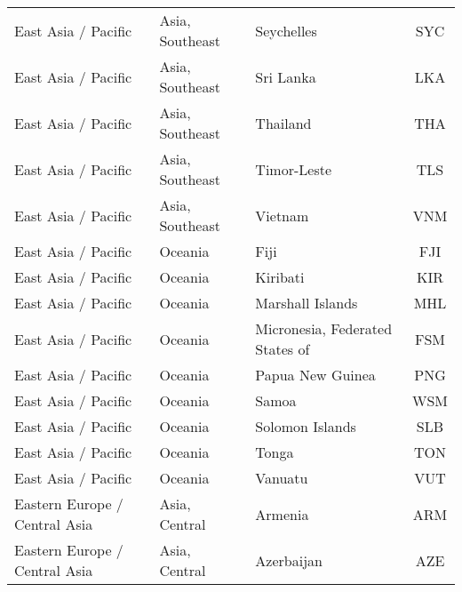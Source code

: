 \begin{longtable}{|p{3cm}|p{3.5cm}|p{5cm}|c|}
           East Asia / Pacific &              Asia, Southeast &                                        Seychelles &  SYC \\
           East Asia / Pacific &              Asia, Southeast &                                         Sri Lanka &  LKA \\
           East Asia / Pacific &              Asia, Southeast &                                          Thailand &  THA \\
           East Asia / Pacific &              Asia, Southeast &                                       Timor-Leste &  TLS \\
           East Asia / Pacific &              Asia, Southeast &                                           Vietnam &  VNM \\
           East Asia / Pacific &                      Oceania &                                              Fiji &  FJI \\
           East Asia / Pacific &                      Oceania &                                          Kiribati &  KIR \\
           East Asia / Pacific &                      Oceania &                                  Marshall Islands &  MHL \\
           East Asia / Pacific &                      Oceania &                   Micronesia, Federated States of &  FSM \\
           East Asia / Pacific &                      Oceania &                                  Papua New Guinea &  PNG \\
           East Asia / Pacific &                      Oceania &                                             Samoa &  WSM \\
           East Asia / Pacific &                      Oceania &                                   Solomon Islands &  SLB \\
           East Asia / Pacific &                      Oceania &                                             Tonga &  TON \\
           East Asia / Pacific &                      Oceania &                                           Vanuatu &  VUT \\
 Eastern Europe / Central Asia &                Asia, Central &                                           Armenia &  ARM \\
 Eastern Europe / Central Asia &                Asia, Central &                                        Azerbaijan &  AZE \\

\end{longtable}
